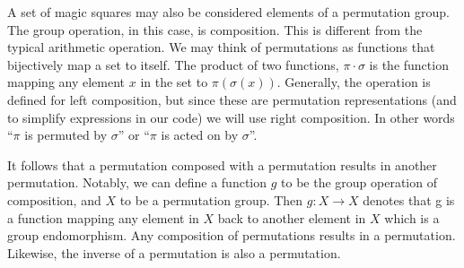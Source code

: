 \documentclass{rhumj_new}
\begin{document}


A set of magic squares may also be considered elements of a permutation group. The group operation,
in this case, is composition. This is different from the typical arithmetic operation. We may think
of permutations as functions that bijectively map a set to itself. The product of two functions,
$\pi\cdot\sigma$ is the function mapping any element $x$ in the set to
$\pi\left(\sigma\left(x\right)\right)$. Generally, the operation is defined for left composition,
but since these are permutation representations (and to simplify expressions in our code) we will
use right composition. In other words ``$\pi$ is permuted by $\sigma$'' or ``$\pi$ is acted on by
$\sigma$''.

It follows that a permutation composed with a permutation results in another permutation. Notably,
we can define a function $g$ to be the group operation of composition, and $X$ to be a permutation
group. Then $g:X\rightarrow X$ denotes that g is a function mapping any element in $X$ back to
another element in $X$ which is a group endomorphism. Any composition of permutations results in a
permutation\cite{Deskins}. Likewise, the inverse of a permutation is also a
permutation\cite{Deskins}.


\end{document}
